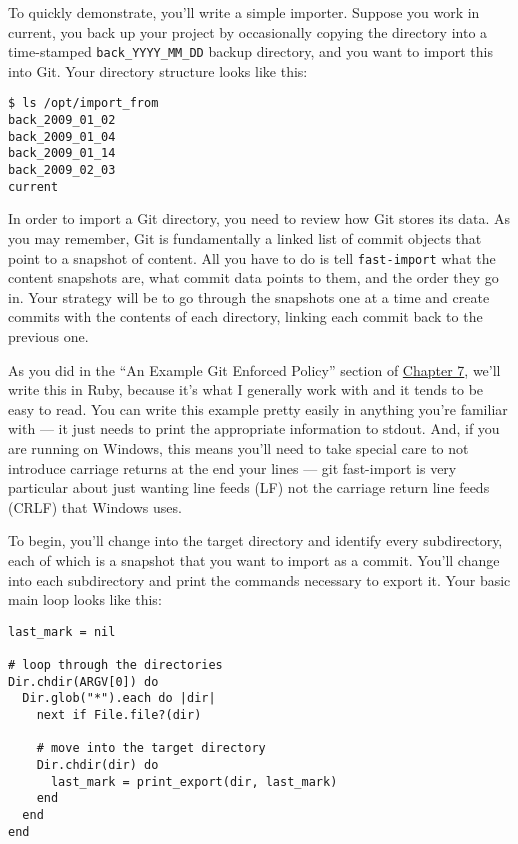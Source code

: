 \documentclass[a4paper]{book}
\newcommand{\prechap}{Chapter }
\newcommand{\postchap}{}
\newcommand{\chapref}[1]{\hyperref[chap:#1]{\prechap #1\postchap}}
\begin{document}
To quickly demonstrate, you'll write a simple importer. Suppose you work in current, you back up your project by occasionally copying the directory into a time-stamped \texttt{back\_YYYY\_MM\_DD} backup directory, and you want to import this into Git. Your directory structure looks like this:

\begin{shaded}\begin{verbatim}
$ ls /opt/import_from
back_2009_01_02
back_2009_01_04
back_2009_01_14
back_2009_02_03
current
\end{verbatim}\end{shaded}

In order to import a Git directory, you need to review how Git stores its data. As you may remember, Git is fundamentally a linked list of commit objects that point to a snapshot of content. All you have to do is tell \texttt{fast-import} what the content snapshots are, what commit data points to them, and the order they go in. Your strategy will be to go through the snapshots one at a time and create commits with the contents of each directory, linking each commit back to the previous one.

As you did in the “An Example Git Enforced Policy” section of \chapref{7}, we'll write this in Ruby, because it's what I generally work with and it tends to be easy to read. You can write this example pretty easily in anything you're familiar with --- it just needs to print the appropriate information to stdout. And, if you are running on Windows, this means you'll need to take special care to not introduce carriage returns at the end your lines --- git fast-import is very particular about just wanting line feeds (LF) not the carriage return line feeds (CRLF) that Windows uses.

To begin, you'll change into the target directory and identify every subdirectory, each of which is a snapshot that you want to import as a commit. You'll change into each subdirectory and print the commands necessary to export it. Your basic main loop looks like this:

\begin{shaded}\begin{verbatim}
last_mark = nil

# loop through the directories
Dir.chdir(ARGV[0]) do
  Dir.glob("*").each do |dir|
    next if File.file?(dir)

    # move into the target directory
    Dir.chdir(dir) do
      last_mark = print_export(dir, last_mark)
    end
  end
end
\end{verbatim}\end{shaded}
\end{document}
